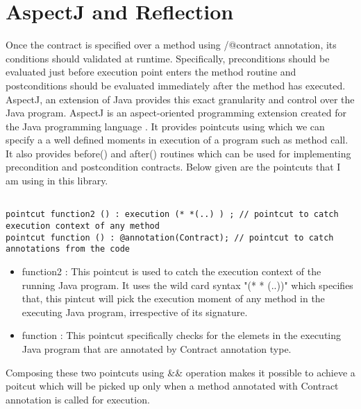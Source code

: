 \section{AspectJ and Reflection}
Once the contract is specified over a method using /@contract annotation, its conditions should validated at runtime. Specifically, preconditions should be evaluated just before execution point enters the method routine and postconditions should be evaluated immediately after the method has executed. AspectJ, an extension of Java provides this exact granularity and control over the Java program.
AspectJ is an aspect-oriented programming extension created for the Java programming language \cite{AspectJWiki:online}. It provides pointcuts using which we can specify a a well defined moments in execution of a program such as method call. It also provides before() and after() routines which can be used for implementing precondition and postcondition contracts.
Below given are the pointcuts that I am using in this library. \linebreak

\begin{minipage}{\linewidth}
\lstset{language=Java, caption=Pointcut in AspectJ, captionpos=b, breaklines=true}       
\begin{lstlisting}[frame=single]

pointcut function2 () : execution (* *(..) ) ; // pointcut to catch execution context of any method	
pointcut function () : @annotation(Contract); // pointcut to catch annotations from the code

\end{lstlisting}
\end{minipage} 

\begin{itemize}
\item function2 : This pointcut is used to catch the execution context of the running Java program. It uses the wild card syntax "(* * (..))" which specifies that, this pintcut will pick the execution moment of any method in the executing Java program, irrespective of its signature. 

\item function : This pointcut specifically checks for the elemets in the executing Java program that are annotated by Contract annotation type.
\end{itemize}

Composing these two pointcuts using \&\& operation makes it possible to achieve a poitcut which will be picked up only when a method annotated with Contract annotation is called for execution.

